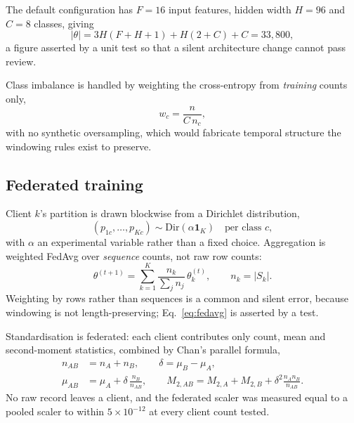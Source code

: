 \documentclass[conference]{IEEEtran}
\begin{document}
The default configuration has $F=16$ input features, hidden width $H=96$ and $C=8$ classes, giving
\begin{equation}
|\theta| = 3H(F + H + 1) + H(2 + C) + C = 33{,}800,
\label{eq:params}
\end{equation}
a figure asserted by a unit test so that a silent architecture change cannot pass review.

Class imbalance is handled by weighting the cross-entropy from \emph{training} counts only,
\begin{equation}
w_c = \frac{n}{C \, n_c},
\label{eq:classweights}
\end{equation}
with no synthetic oversampling, which would fabricate temporal structure the windowing rules
exist to preserve.

\subsection{Federated training}
Client $k$'s partition is drawn blockwise from a Dirichlet distribution,
\begin{equation}
(p_{1c},\dots,p_{Kc}) \sim \mathrm{Dir}(\alpha \mathbf{1}_K) \quad \text{per class } c,
\label{eq:dirichlet}
\end{equation}
with $\alpha$ an experimental variable rather than a fixed choice. Aggregation is weighted
FedAvg over \emph{sequence} counts, not raw row counts:
\begin{equation}
\theta^{(t+1)} = \sum_{k=1}^{K} \frac{n_k}{\sum_j n_j}\, \theta_k^{(t)},
\qquad n_k = |S_k|.
\label{eq:fedavg}
\end{equation}
Weighting by rows rather than sequences is a common and silent error, because windowing is not
length-preserving; Eq.~\eqref{eq:fedavg} is asserted by a test.

Standardisation is federated: each client contributes only count, mean and second-moment
statistics, combined by Chan's parallel formula,
\begin{align}
n_{AB} &= n_A + n_B, \qquad \delta = \mu_B - \mu_A, \label{eq:chan1}\\
\mu_{AB} &= \mu_A + \delta\,\frac{n_B}{n_{AB}}, \qquad
M_{2,AB} = M_{2,A} + M_{2,B} + \delta^2\frac{n_A n_B}{n_{AB}}. \label{eq:chan2}
\end{align}
No raw record leaves a client, and the federated scaler was measured equal to a pooled scaler to
within $5\times10^{-12}$ at every client count tested.
\end{document}
